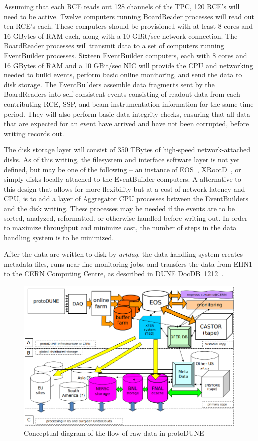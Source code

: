 Assuming that each RCE reads out 128 channels of the TPC, 120 RCE's
will need to be active.  Twelve computers running BoardReader
processes will read out ten RCE's each.  These computers should be
provisioned with at least 8 cores and 16 GBytes of RAM each, along
with a 10 GBit/sec network connection.  The BoardReader processes will
transmit data to a set of computers running EventBuilder processes.
Sixteen EventBuilder computers, each with 8 cores and 16 GBytes of RAM
and a 10 GBit/sec NIC will provide the CPU and networking needed to
build events, perform basic online monitoring, and send the data to
disk storage.  The EventBuilders assemble data fragments sent by the
BoardReaders into self-consistent events consisting of readout data
from each contributing RCE, SSP, and beam instrumentation information
for the same time period.  They will also perform basic data integrity
checks, ensuring that all data that are expected for an event have
arrived and have not been corrupted, before writing records out.

The disk storage layer will consist of 350 TBytes of high-speed
network-attached disks.  As of this writing, the filesystem and
interface software layer is not yet defined, but may be one of the
following -- an instance of EOS~\cite{eos}, XRootD~\cite{xrootd}, or
simply disks locally attached to the EventBuilder computers.  A
alternative to this design that allows for more flexibility but at a
cost of network latency and CPU, is to add a layer of Aggregator CPU
processes between the EventBuilders and the disk writing.  These
processes may be needed if the events are to be sorted, analyzed,
reformatted, or otherwise handled before writing out.  In order to
maximize throughput and minimize cost, the number of steps in the data
handling system is to be minimized.

After the data are written to disk by {\it artdaq}, the data handling
system creates metadata files, runs near-line monitoring jobs, and
transfers the data from EHN1 to the CERN Computing Centre, as
described in DUNE DocDB~1212~\cite{docdb1212}.

\begin{figure}[tbh]
\centering
\includegraphics[width=\linewidth]{figures/protoDUNE_raw_data_concept.png}
\caption{\label{fig:raw_concept}Conceptual diagram of the flow of raw data in protoDUNE}
\end{figure}


